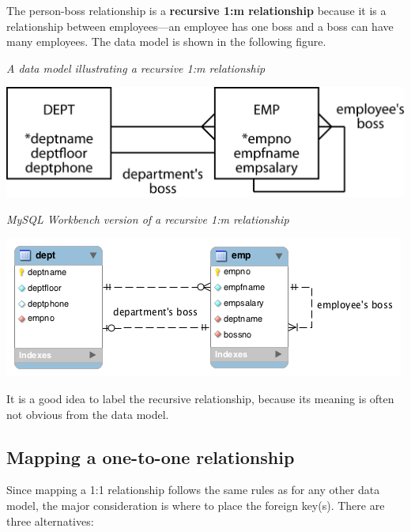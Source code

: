 \documentclass[
]{article}
\begin{document}
The person-boss relationship is a \textbf{recursive 1:m relationship} because
it is a relationship between employees---an employee has one boss and a
boss can have many employees. The data model is shown in the following
figure.

\emph{A data model illustrating a recursive 1:m relationship}

\includegraphics[width=5.67708in,height=\textheight]{Figures/Chapter 6/recursive-1-and-m.png}

\emph{MySQL Workbench version of a recursive 1:m relationship}

\includegraphics{Figures/Chapter 6/recursive-1-and-m-wb.png}

It is a good idea to label the recursive relationship, because its
meaning is often not obvious from the data model.

\hypertarget{mapping-a-one-to-one-relationship}{%
\subsection*{Mapping a one-to-one relationship}\label{mapping-a-one-to-one-relationship}}

Since mapping a 1:1 relationship follows the same rules as for any other
data model, the major consideration is where to place the foreign
key(s). There are three alternatives:
\end{document}
